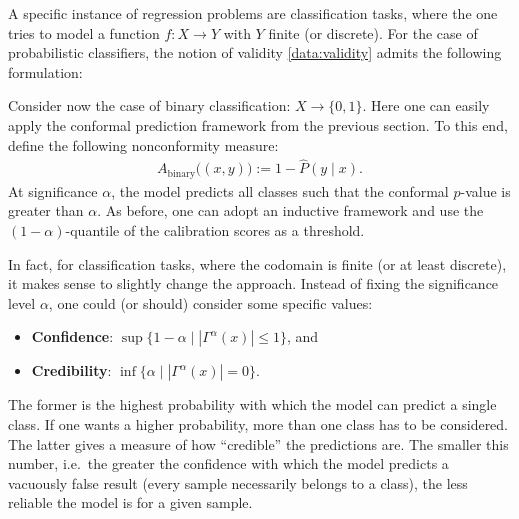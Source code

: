     A specific instance of regression problems are classification tasks, where the one tries to model a function $f:X\rightarrow Y$ with $Y$ finite (or discrete). For the case of probabilistic classifiers, the notion of validity \ref{data:validity} admits the following formulation:

    Consider now the case of binary classification: $X\rightarrow\{0,1\}$. Here one can easily apply the conformal prediction framework from the previous section. To this end, define the following nonconformity measure:
    \begin{gather}
        A_\text{binary}\big((x,y)\big) := 1 - \widehat{P}(y\mid x).
    \end{gather}
    At significance $\alpha$, the model predicts all classes such that the conformal $p$-value is greater than $\alpha$. As before, one can adopt an inductive framework and use the $(1-\alpha)$-quantile of the calibration scores as a threshold.

    In fact, for classification tasks, where the codomain is finite (or at least discrete), it makes sense to slightly change the approach. Instead of fixing the significance level $\alpha$, one could (or should) consider some specific values:
    \begin{itemize}
        \item\textbf{Confidence}: $\sup\{1-\alpha\mid|\Gamma^\alpha(x)|\leq1\}$, and
        \item\textbf{Credibility}: $\inf\{\alpha\mid|\Gamma^\alpha(x)|=0\}$.
    \end{itemize}
    The former is the highest probability with which the model can predict a single class. If one wants a higher probability, more than one class has to be considered. The latter gives a measure of how ``credible'' the predictions are. The smaller this number, i.e.~the greater the confidence with which the model predicts a vacuously false result (every sample necessarily belongs to a class), the less reliable the model is for a given sample.

